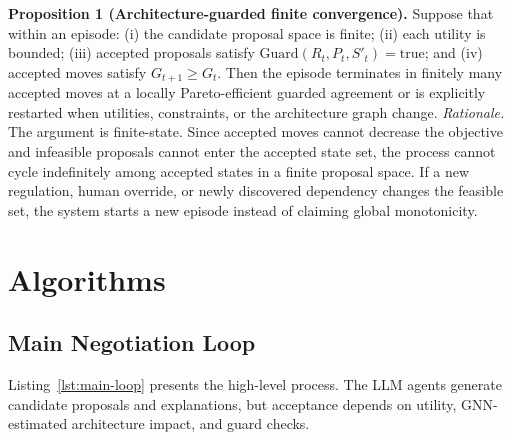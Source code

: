 \documentclass[english,preprint,nonatbib]{elsarticle}
\begin{document}
\textbf{Proposition 1 (Architecture-guarded finite convergence).} Suppose that within an episode: (i) the candidate proposal space is finite;
(ii) each utility is bounded; (iii) accepted proposals satisfy $\text{Guard}(R_t,P_t,S'_t)=\mathrm{true}$; and (iv) accepted moves satisfy $G_{t+1}\geq G_t$.
Then the episode terminates in finitely many accepted moves at a locally Pareto-efficient guarded agreement or is explicitly restarted when utilities, constraints, or the architecture graph change.
\textit{Rationale.} The argument is finite-state. Since accepted moves cannot decrease the objective and infeasible proposals cannot enter the accepted state set, the process cannot cycle indefinitely among accepted states in a finite proposal space.
If a new regulation, human override, or newly discovered dependency changes the feasible set, the system starts a new episode instead of claiming global monotonicity.

\section{Algorithms}
\label{sec:algorithms}

\subsection{Main Negotiation Loop}

Listing~\ref{lst:main-loop} presents the high-level process. The LLM agents generate candidate proposals and explanations, but acceptance depends on utility, GNN-estimated architecture impact, and guard checks.
\end{document}
